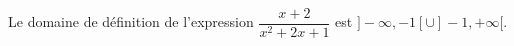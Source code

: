 Le domaine de définition de l'expression $\dfrac{x+2}{x^2+2x+1}$ est $]-\infty,-1[\cup ]-1,+\infty[$.

\begin{reponses}
\end{reponses}

